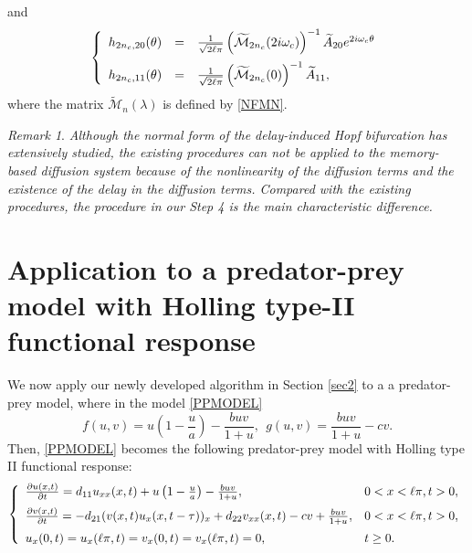 \documentclass[11pt]{article}
\theoremstyle{definition}
\theoremstyle{remark}
\newtheorem{remark}[theorem]{Remark}
\numberwithin{equation}{section}
\begin{document}
and
\begin{equation*}
\label{H2NC}
\left\{
\begin{array}{lll}
h_{2n_c,20}(\theta) &=&\frac{1}{\sqrt{2\ell\pi}}\left(\widetilde{\mathcal{M}}_{2n_c}(2i\omega_c)\right)^{-1}\widetilde{A}_{20}e^{2i\omega_c\theta}\vspace{0.2cm}\\
h_{2n_c,11}(\theta) &=&\frac{1}{\sqrt{2\ell\pi}}\left(\widetilde{\mathcal{M}}_{2n_c}(0)\right)^{-1}\widetilde{A}_{11},
\end{array}
\right.
\end{equation*}
where the matrix $ \widetilde{\mathcal{M}}_n(\lambda)$ is defined by  \eqref{NFMN}.


\begin{remark}{\it
Although the normal form of the delay-induced Hopf bifurcation has extensively studied, the existing procedures can not be applied to the memory-based diffusion system because of the
nonlinearity of the diffusion terms and the existence of the delay in the diffusion terms.  Compared with the existing procedures, the procedure in our Step 4 is the main characteristic difference.}
\end{remark}
\section{Application to a  predator-prey model with Holling type-II functional response}\label{sec3}

 We now apply our newly developed algorithm in Section \ref{sec2} to a a  predator-prey model, where in the model \eqref{PPMODEL}
 $$
f(u,v)=u\left(1-\frac{u}{a}\right)-\frac{buv}{1+u},~~g(u,v)=\frac{buv}{1+u}-c v.
$$
 Then,  \eqref{PPMODEL}  becomes the following  predator-prey model with Holling type II functional response:
\begin{equation}
\label{Exa-PP}
\left\{  \begin{array}{ll}
  \frac{\partial u(x,t)}{\partial t}=d_{11}u_{xx}(x,t)+u\left(1-\frac{u}{a}\right)-\frac{buv}{1+u}, & 0<x<\ell\pi, t>0, \vspace{0.2cm}\\
\frac{\partial v(x,t)}{\partial t}=-d_{21}(v(x,t)u_{x}(x,t-\tau))_x+d_{22}v_{xx}(x,t)-cv+\frac{buv}{1+u}, & 0<x<\ell\pi, t>0,\vspace{0.2cm}\\
u_x(0,t)=u_x(\ell\pi,t)=v_x(0,t)=v_x(\ell\pi,t)=0, & t\geq 0.
  \end{array}
  \right.
 \end{equation}
\end{document}
